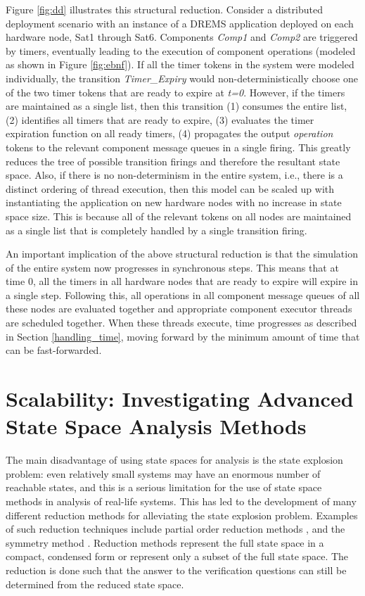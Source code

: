 Figure \ref{fig:dd} illustrates this structural reduction. Consider a distributed deployment scenario with an instance of a DREMS application deployed on each hardware node, Sat1 through Sat6. Components \emph{Comp1} and \emph{Comp2} are triggered by timers, eventually leading to the execution of component operations (modeled as shown in Figure \ref{fig:ebnf}). If all the timer tokens in the system were modeled individually, the transition \emph{Timer\_Expiry} would non-deterministically choose one of the two timer tokens that are ready to expire at \emph{t=0}. However, if the timers are maintained as a single list, then this transition (1) consumes the entire list, (2) identifies all timers that are ready to expire, (3) evaluates the timer expiration function on all ready timers, (4) propagates the output \emph{operation} tokens to the relevant component message queues in a single firing. This greatly reduces the tree of possible transition firings and therefore the resultant state space. Also, if there is no non-determinism in the entire system, i.e., there is a distinct ordering of thread execution, then this model can be scaled up with instantiating the application on new hardware nodes with no increase in state space size. This is because all of the relevant tokens on all nodes are maintained as a single list that is completely handled by a single transition firing. 

An important implication of the above structural reduction is that the simulation of the entire system now progresses in synchronous steps. This means that at time 0, all the timers in all hardware nodes that are ready to expire will expire in a single step. Following this, all operations in all component message queues of all these nodes are evaluated together and appropriate component executor threads are scheduled together. When these threads execute, time progresses as described in Section \ref{handling_time}, moving forward by the minimum amount of time that can be fast-forwarded.

\newpage
\section{Scalability: Investigating Advanced State Space Analysis Methods}

The main disadvantage of using state spaces for analysis is the state explosion problem: even relatively small systems may have an enormous number of reachable states, and this is a serious limitation for the use of state space methods in analysis of real-life systems. This has led to the development of many different reduction methods for alleviating the state explosion problem. Examples of such reduction techniques include partial order reduction methods \cite{peled1993all, valmari1990stubborn, wolper1993partial}, and the symmetry method \cite{jensen1996condensed}. Reduction methods represent the full state space in a compact, condensed form or represent only a subset of the full state space. The reduction is done such that the answer to the verification questions can still be determined from the reduced state space. 

